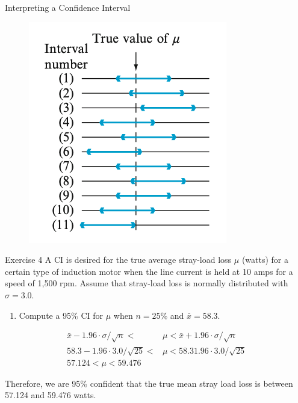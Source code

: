 \documentclass[
  ignorenonframetext,
]{beamer}
\providecommand{\tightlist}{%
  \setlength{\itemsep}{0pt}\setlength{\parskip}{0pt}}\usepackage{longtable,booktabs,array}
\begin{document}
\begin{frame}{Interpreting a Confidence Interval}
\protect\hypertarget{interpreting-a-confidence-interval-4}{}
\begin{figure}

{\centering \includegraphics{images/CIinterpretation.png}

}

\end{figure}
\end{frame}

\begin{frame}{Exercise 4}
\protect\hypertarget{exercise-4}{}
A CI is desired for the true average stray-load loss \(\mu\) (watts) for
a certain type of induction motor when the line current is held at 10
amps for a speed of 1,500 rpm. Assume that stray-load loss is normally
distributed with \(\sigma = 3.0\).

\begin{enumerate}[<+->]
[a.]
\tightlist
\item
  Compute a 95\% CI for \(\mu\) when \(n = 25\)\% and
  \(\bar{x} = 58.3\).
\end{enumerate}

\[
\begin{aligned}
\bar{x} -  1.96\cdot \sigma/\sqrt{n} < &\mu < \bar{x} + 1.96\cdot \sigma/\sqrt{n} \\
58.3 -  1.96\cdot 3.0/\sqrt{25} < &\mu < 58.3 1.96\cdot 3.0/\sqrt{25} \\
57.124 < \mu < 59.476
\end{aligned}
\]

Therefore, we are 95\% confident that the true mean stray load loss is
between 57.124 and 59.476 watts.
\end{frame}
\end{document}
